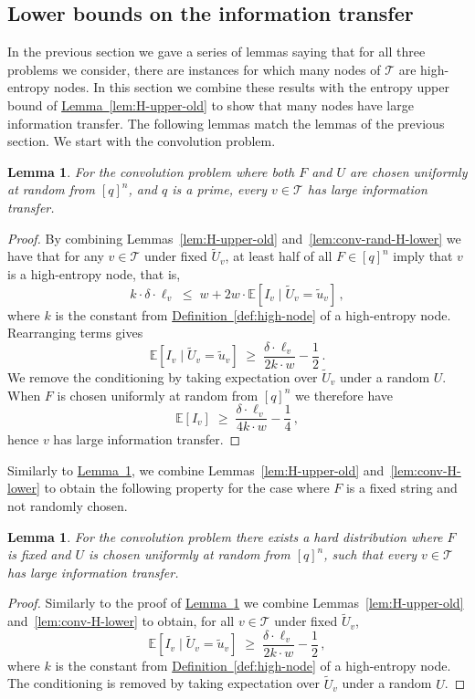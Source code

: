 \documentclass[11pt]{article}
\numberwithin{equation}{section}
\newtheorem{lemma}[theorem]{Lemma}
\theoremstyle{definition}
\theoremstyle{plain}
\newcommand{\expref}[2]{\hyperref[#2]{#1~\ref{#2}}}
\newcommand{\calT}{\ensuremath{\mathcal{T}}}
\newcommand{\expected}[1]{\ensuremath{\mathbb{E}[#1]}}
\newcommand{\lit}{large information transfer\xspace}
\newcommand{\Xvknown}{\ensuremath{\widetilde{U}_v}}
\newcommand{\Xvfix}{\ensuremath{\widetilde{u}_v}}
\newcommand{\vit}{\ensuremath{I_v}}
\begin{document}
\subsection{Lower bounds on the information transfer}\label{sec:entropycomb}

In the previous section we gave a series of lemmas saying that for all three problems we consider, there are instances for which many nodes of $\calT$ are high-entropy nodes. In this section we combine these results with the entropy upper bound of \expref{Lemma}{lem:H-upper-old} to show that many nodes have \lit.
The following lemmas match the lemmas of the previous section.
We start with the convolution problem.

\begin{lemma}
	\label{lem:conv-random-it}
	For the convolution problem where both $F$ and $U$ are chosen uniformly at random from $[q]^n$, and $q$ is a prime, every $v\in\calT$ has \lit.
\end{lemma}
\begin{proof}
	By combining Lemmas~\ref{lem:H-upper-old} and~\ref{lem:conv-rand-H-lower} we have that for any $v\in\calT$ under fixed $\Xvknown$, at least half of all $F\in [q]^n$ imply that $v$ is a high-entropy node, that is,
	\[
	k\cdot \delta \cdot\ell_v
	\;\leq\;
	w + 2w\cdot \expected{\vit \mid \Xvknown=\Xvfix}\,,
	\]
	where $k$ is the constant from \expref{Definition}{def:high-node} of a high-entropy node.
	Rearranging terms gives
	\[
	\expected{\vit \mid \Xvknown=\Xvfix}
	\;\geq\;
	\frac{\delta \cdot\ell_v}{2k\cdot w} - \frac12\,.
	\]
	We remove the conditioning by taking expectation over $\Xvknown$ under a random $U$.
	When $F$ is chosen uniformly at random from $[q]^n$ we therefore have
	\[
	\expected{\vit}
	\;\geq\;
	\frac{\delta \cdot\ell_v}{4k\cdot w} - \frac14\,,
	\]
	hence $v$ has \lit.
\end{proof}

Similarly to \expref{Lemma}{lem:conv-random-it}, we combine Lemmas~\ref{lem:H-upper-old} and~\ref{lem:conv-H-lower} to obtain the following property for the case where $F$ is a fixed string and not randomly chosen.

\begin{lemma}
	\label{lem:conv-it}
	For the convolution problem there exists a hard distribution where $F$ is fixed and $U$ is chosen uniformly at random from $[q]^n$, such that every $v\in\calT$ has \lit.
\end{lemma}
\begin{proof}
	Similarly to the proof of \expref{Lemma}{lem:conv-random-it} we combine Lemmas~\ref{lem:H-upper-old} and~\ref{lem:conv-H-lower} to obtain, for all $v\in\calT$ under fixed $\Xvknown$,
	\[
	\expected{\vit \mid \Xvknown=\Xvfix}
	\;\geq\;
	\frac{\delta \cdot\ell_v}{2k\cdot w} - \frac12\,,
	\]
	where $k$ is the constant from \expref{Definition}{def:high-node} of a high-entropy node.
	The conditioning is removed by taking expectation over $\Xvknown$ under a random $U$.
\end{proof}
\end{document}
